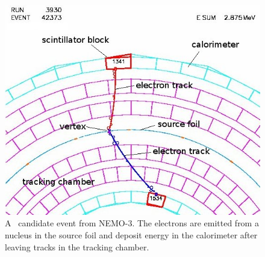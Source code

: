 \begin{figure}[htbp]
\centering
\includegraphics[width=0.7\linewidth]{Figures/nemo3_3930_42373_top_2}
\caption{A \zeronubb~candidate event from NEMO-3. The electrons are emitted from a nucleus in the source foil and deposit energy in the calorimeter after leaving tracks in the tracking chamber.}
\label{fig:nemo3393042373top2}
\end{figure}


